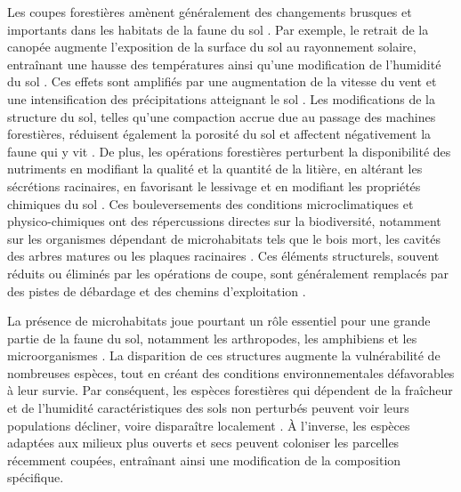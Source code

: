 Les coupes forestières amènent généralement des changements brusques et importants dans les habitats de la faune du sol \citep{Lindo2003Microbialbiomass,Paillet2010Biodiversitydifferences,Fedrowitz2014Canretention,Chaudhary2016Impactforest}. 
Par exemple, le retrait de la canopée augmente l'exposition de la surface du sol au rayonnement solaire, entraînant une hausse des températures ainsi qu'une modification de l'humidité du sol \citep{Lindo2003Microbialbiomass,Brook2008Synergiesextinction,Zhang2022Intensiveforest}. 
Ces effets sont amplifiés par une augmentation de la vitesse du vent et une intensification des précipitations atteignant le sol \citep{Keenan1993ecologicaleffects,Heithecker2007Edgerelatedgradients}. 
Les modifications de la structure du sol, telles qu'une compaction accrue due au passage des machines forestières, réduisent également la porosité du sol et affectent négativement la faune qui y vit \citep{Battigelli2004Shorttermimpact,Mazerolle2021Woodlandsalamander}. 
De plus, les opérations forestières perturbent la disponibilité des nutriments en modifiant la qualité et la quantité de la litière, en altérant les sécrétions racinaires, en favorisant le lessivage et en modifiant les propriétés chimiques du sol \citep{Covington1981Changesforest,Marshall2000Impactsforest,Lindo2003Microbialbiomass,Battigelli2004Shorttermimpact}. 
Ces bouleversements des conditions microclimatiques et physico-chimiques ont des répercussions directes sur la biodiversité, 
notamment sur les organismes dépendant de microhabitats tels que le bois mort, les cavités des arbres matures ou les plaques racinaires \citep{Spies1999Dynamicforest,Christensen2005Deadwood,Brassard2008EffectsForest}. 
Ces éléments structurels, souvent réduits ou éliminés par les opérations de coupe, sont généralement remplacés par des pistes de débardage et des chemins d'exploitation \citep{Hansen1991ConservingBiodiversity}. 

La présence de microhabitats joue pourtant un rôle essentiel pour une grande partie de la faune du sol, notamment les arthropodes, les amphibiens et les microorganismes \citep{Paillet2010Biodiversitydifferences,Fedrowitz2014Canretention,Chaudhary2016Impactforest}. 
La disparition de ces structures augmente la vulnérabilité de nombreuses espèces, tout en créant des conditions environnementales défavorables à leur survie. 
Par conséquent, les espèces forestières qui dépendent de la fraîcheur et de l'humidité caractéristiques des sols non perturbés peuvent voir leurs populations décliner, voire disparaître localement \citep{Kudrin2023metaanalysiseffects}. 
À l'inverse, les espèces adaptées aux milieux plus ouverts et secs peuvent coloniser les parcelles récemment coupées, entraînant ainsi une modification de la composition spécifique. 

